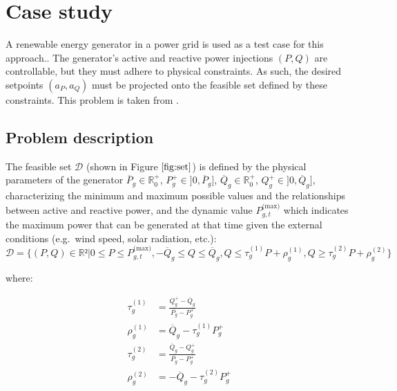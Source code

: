 \documentclass[
]{article}
\begin{document}
\section{Case study}\label{case-study}

A renewable energy generator in a power grid is used as a test case for
this approach.. The generator's active and reactive power injections
\((P,Q)\) are controllable, but they must adhere to physical
constraints. As such, the desired setpoints \((a_P, a_Q)\) must be
projected onto the feasible set defined by these constraints. This
problem is taken from \citep{henryGymANMReinforcementLearning2021}.

\subsection{Problem description}\label{problem-description}

The feasible set \(\mathcal{D}\) (shown in Figure \(\ref{fig:set}\)) is
defined by the physical parameters of the generator
\(\overline{P}_g \in \mathbb{R}_0^+\),
\(P^+_g \in ]0, \overline{P}_g]\),
\(\overline{Q}_g \in \mathbb{R}_0^+\),
\(Q^+_g \in ]0, \overline{Q}_g]\), characterizing the minimum and
maximum possible values and the relationships between active and
reactive power, and the dynamic value \(P^{\textrm{(max)}}_{g,t}\) which
indicates the maximum power that can be generated at that time given the
external conditions (e.g.~wind speed, solar radiation, etc.):
\begin{equation}
\mathcal{D} = \{(P, Q) \in \mathbb{R}² | 0 \leq P \leq P^{\textrm{(max)}}_{g,t}, -\overline{Q}_g \leq Q \leq \overline{Q}_g, Q \leq \tau^{(1)}_g P + \rho_g^{(1)}, Q \geq \tau^{(2)}_g P + \rho_g^{(2)}\}
\end{equation}

where:

\begin{align}
    \tau^{(1)}_g &= \frac{Q_g^+ - \overline{Q}_g}{\overline{P_g} - P_g^+}\\
    \rho^{(1)}_g &= \overline{Q}_g - \tau^{(1)}_gP_g^+\\
    \tau^{(2)}_g &= \frac{\overline{Q}_g -Q_g^+ }{\overline{P_g} - P_g^+}\\
    \rho^{(2)}_g &= -\overline{Q}_g - \tau^{(2)}_gP_g^+  \\
\end{align}
\end{document}
